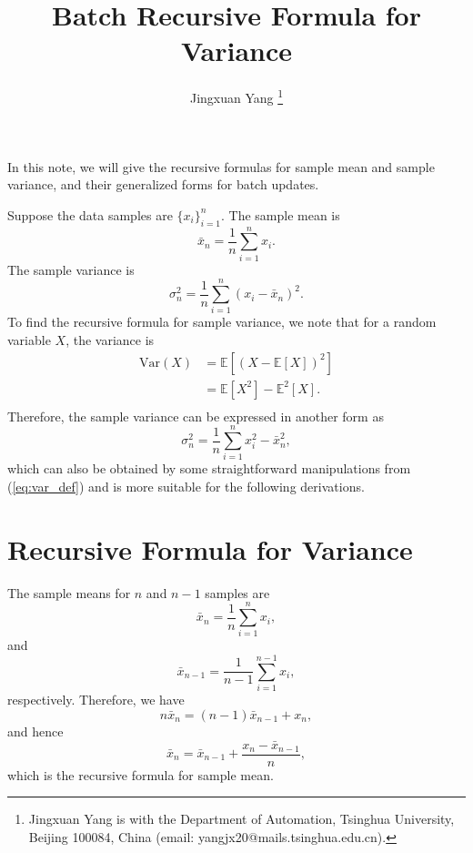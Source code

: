 \documentclass{article}
\title{Batch Recursive Formula for Variance}
\author{Jingxuan Yang%
\thanks{Jingxuan Yang is with the Department of Automation, Tsinghua University, Beijing 100084, China (email: yangjx20@mails.tsinghua.edu.cn).}
}
\begin{document}
\maketitle

In this note, we will give the recursive formulas for sample mean and sample variance, and their generalized forms for batch updates.

Suppose the data samples are $\{x_i\}_{i=1}^n$. The sample mean is
\begin{equation}
  \bar{x}_n=\frac{1}{n}\sum_{i=1}^nx_i.
\end{equation}
The sample variance is
\begin{equation}
  \label{eq:var_def}
  \sigma_n^2=\frac{1}{n}\sum_{i=1}^n(x_i-\bar{x}_n)^2.
\end{equation}
To find the recursive formula for sample variance, we note that for a random variable $X$, the variance is
\begin{equation}
  \begin{aligned}
    \mathrm{Var}(X)
    &=\mathbb{E}[(X-\mathbb{E}[X])^2]\\
    &=\mathbb{E}[X^2]-\mathbb{E}^2[X].\\
  \end{aligned}
\end{equation}
Therefore, the sample variance can be expressed in another form as
\begin{equation}
  \sigma_n^2=\frac{1}{n}\sum_{i=1}^nx_i^2-\bar{x}_n^2,
\end{equation}
which can also be obtained by some straightforward manipulations from (\ref{eq:var_def}) and is more suitable for the following derivations.

\section{Recursive Formula for Variance}

The sample means for $n$ and $n-1$ samples are
\begin{equation}
  \bar{x}_n=\frac{1}{n}\sum_{i=1}^nx_i,
\end{equation}
and
\begin{equation}
  \bar{x}_{n-1}=\frac{1}{n-1}\sum_{i=1}^{n-1}x_i,
\end{equation}
respectively. Therefore, we have
\begin{equation}
  \label{eq:mean_diff}
  n\bar{x}_n=(n-1)\bar{x}_{n-1}+x_n,
\end{equation}
and hence
\begin{equation}
  \label{eq:recursive_mean}
  \bar{x}_n=\bar{x}_{n-1}+\frac{x_n-\bar{x}_{n-1}}{n},
\end{equation}
which is the recursive formula for sample mean.
\end{document}
